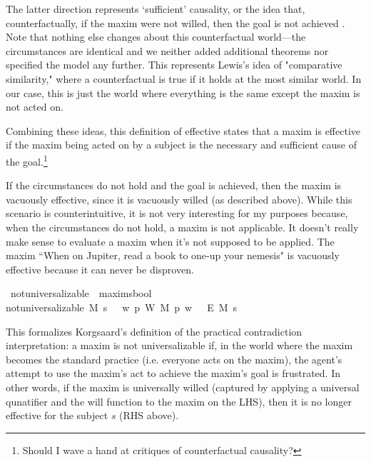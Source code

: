 \begin{isabellebody}
\begin{isamarkuptext}
The latter direction represents `sufficient' causality, or the idea that, counterfactually,
if the maxim were not willed, then the goal is not achieved \cite{lewiscausality}. Note that nothing else changes about this
counterfactual world—the circumstances are identical and we neither added additional theorems nor 
specified the model any further. This represents Lewis's idea of "comparative similarity," \cite{lewiscounterfactuals} where 
a counterfactual is true if it holds at the most similar world. In our case, this is just the world 
where everything is the same except the maxim is not acted on.

Combining these ideas, this definition of effective states that a maxim is effective if the 
maxim being acted on by a subject is the necessary and sufficient cause of the goal.\footnote{Should I wave a hand at critiques of counterfactual causality?}

If the circumstances do not hold and the goal is achieved, then the maxim is vacuously effective, since 
it is vacuously willed (as described above). While this scenario is counterintuitive, it is not very 
interesting for my purposes because, when the circumstances do not hold, a maxim is not applicable. It 
doesn't really make sense to evaluate a maxim when it's not supposed to be applied. The maxim ``When on Jupiter,
read a book to one-up your nemesis" is vacuously effective because it can never be disproven.%
\end{isamarkuptext}\isamarkuptrue%
\isamarkupfalse%
\ not{\isacharunderscore}universalizable\ {\isacharcolon}{\isacharcolon}\ {\isachardoublequoteopen}maxim{\isasymRightarrow}s{\isasymRightarrow}bool{\isachardoublequoteclose}\ \ \isanewline
{\isachardoublequoteopen}not{\isacharunderscore}universalizable\ M\ s\ {\isacharequal}\ {\isacharparenleft}{\isasymTurnstile}\ {\isacharparenleft}{\isacharparenleft}{\isasymlambda}w{\isachardot}\ {\isasymforall}p{\isachardot}\ W\ M\ p\ w{\isacharparenright}\ \isactrlbold {\isasymrightarrow}\ {\isacharparenleft}\isactrlbold {\isasymnot}\ {\isacharparenleft}E\ M\ s{\isacharparenright}{\isacharparenright}{\isacharparenright}{\isacharparenright}{\isachardoublequoteclose}\isanewline
%
%
\begin{isamarkuptext}%
This formalizes Korgsaard's definition of the practical contradiction
interpretation:  a maxim is not universalizable 
if, in the world where the maxim becomes the standard practice (i.e. everyone acts on the maxim), the
agent's attempt to use the maxim's act to achieve the maxim's goal is frustrated. In other words, if 
the maxim is universally willed (captured by applying a universal qunatifier and the will function 
to the maxim on the LHS), then it is no longer effective for the subject $s$ (RHS above). 


\end{isamarkuptext}
\end{isabellebody}
